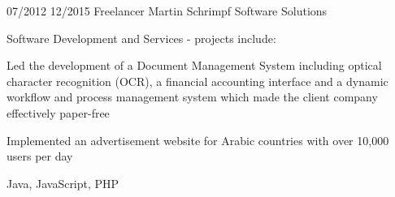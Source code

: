 {\block%
{%
07/2012
}{%
12/2015
}{%
Freelancer
}{%
Martin Schrimpf Software Solutions
}{%
Software Development and Services - projects include:
\begin{description}[noitemsep,topsep=0pt,font=\normalfont\itshape\space]
\item[Greimel IT-Systemhaus GmbH] Led the development of a Document Management System including optical character recognition (OCR), a financial accounting interface and a dynamic workflow and process management system which made the client company effectively paper-free
\item[Promonde JLT] Implemented an advertisement website for Arabic countries with over 10,000 users per day
\end{description}
}{%
Java, JavaScript, PHP
}
}


\newcommand{\publications}{%
\block%
{%
2017
}{%
}{%
}{%
}{%
\vspace{-8pt} %
\fullcite{schrimpf2017}
}{%
}

\block%
{%
2017
}{%
}{%
}{%
}{%
\vspace{-8pt}
\fullcite{cheney2017robustness}
}{%
}

\block%
{%
2017
}{%
}{%
}{%
}{%
\vspace{-8pt}
\fullcite{recurrency_occlusion}
}{%
}

\block%
{%
2014
}{%
}{%
}{%
}{%
\vspace{-8pt}
\fullcite{bachelors_thesis}
}{%
}
}


\newcommand{\presentations}{%
\block%
{%
12/2016
}{%
}{%
}{%
Brains \& Bits, NIPS Workshops
}{%
Recurrent computations for pattern completion
}{%
}

\block%
{%
10/2016
}{%
}{%
}{%
Systems Club, Harvard Medical School
}{%
Recurrent computations for pattern completion
}{%
}
}


